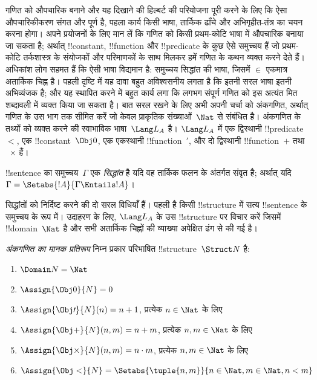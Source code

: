 \documentclass[../../../include/open-logic-section]{subfiles}
\begin{document}


गणित को औपचारिक बनाने और यह दिखाने की हिल्बर्ट की परियोजना पूरी करने के लिए
कि ऐसा औपचारिकीकरण संगत और पूर्ण है, पहला कार्य किसी भाषा, तार्किक ढाँचे और
अभिगृहीत-तंत्र का चयन करना होगा। अपने प्रयोजनों के लिए मान लें कि गणित को
किसी प्रथम-कोटि भाषा में औपचारिक बनाया जा सकता है; अर्थात् !!{constant},
!!{function} और !!{predicate} के कुछ ऐसे समुच्चय हैं जो प्रथम-कोटि
तर्कशास्त्र के संयोजकों और परिमाणकों के साथ मिलकर हमें गणित के कथन व्यक्त
करने देते हैं। अधिकांश लोग सहमत हैं कि ऐसी भाषा विद्यमान है: समुच्चय सिद्धांत
की भाषा, जिसमें $\in$ एकमात्र अतार्किक चिह्न है। पहली दृष्टि में यह दावा बहुत
अविश्वसनीय लगता है कि इतनी सरल भाषा इतनी अभिव्यंजक है; और यह स्थापित करने में
बहुत कार्य लगा कि लगभग संपूर्ण गणित को इस अत्यंत मित शब्दावली में व्यक्त किया
जा सकता है। बात सरल रखने के लिए अभी अपनी चर्चा को अंकगणित, अर्थात् गणित के
उस भाग तक सीमित करें जो केवल प्राकृतिक संख्याओं~$\Nat$ से संबंधित है।
अंकगणित के तथ्यों को व्यक्त करने की स्वाभाविक भाषा~$\Lang L_A$ है। $\Lang
L_A$ में एक द्विस्थानी !!{predicate}~$<$, एक !!{constant}~$\Obj 0$, एक
एकस्थानी !!{function}~$\prime$, और दो द्विस्थानी !!{function}~$+$ तथा
~$\times$ हैं।

\begin{defn}
!!{sentence} का समुच्चय~$\Gamma$ एक \emph{सिद्धांत} है यदि वह तार्किक
फलन के अंतर्गत संवृत है; अर्थात् यदि $\Gamma = \Setabs{!A}{\Gamma \Entails
!A}$।
\end{defn}

सिद्धांतों को निर्दिष्ट करने की दो सरल विधियाँ हैं। पहली है किसी
!!{structure} में सत्य !!{sentence} के समुच्चय के रूप में। उदाहरण के लिए,
$\Lang L_A$ के उस !!{structure} पर विचार करें जिसमें !!{domain}~$\Nat$ है और
सभी अतार्किक चिह्नों की व्याख्या अपेक्षित ढंग से की गई है।

\begin{defn}
\emph{अंकगणित का मानक प्रतिरूप} निम्न प्रकार परिभाषित !!{structure}~$\Struct
N$ है:
\begin{enumerate}
\item $\Domain N = \Nat$
\item $\Assign{\Obj 0}{N} = 0$
\item $\Assign{\Obj \prime}{N}(n) = n + 1$, प्रत्येक $n \in \Nat$ के लिए
\item $\Assign{\Obj +}{N}(n, m) = n + m$, प्रत्येक $n, m \in \Nat$ के लिए
\item $\Assign{\Obj \times}{N}(n, m) = n\cdot m$, प्रत्येक $n, m \in \Nat$ के लिए
\item $\Assign{\Obj <}{N} = \Setabs{\tuple{n, m}}{n \in \Nat, m \in
  \Nat, n < m}$
\end{enumerate}
\end{defn}
\end{document}
